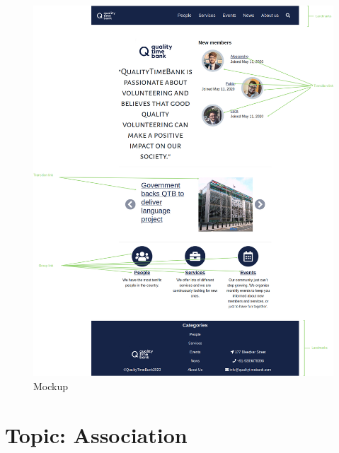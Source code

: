 \documentclass[a4paper, 11pt, parskip=half, headsepline]{scrreprt}
\begin{document}
\begin{figure}[H]
    \centering
    \includegraphics[width=1\linewidth, keepaspectratio]{mockups/Home_Page}
    \caption{Mockup}
\end{figure}

\section{Topic: Association}
\end{document}
